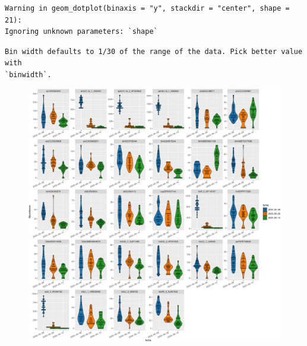 \documentclass[
  letterpaper,
  DIV=11,
  numbers=noendperiod]{scrartcl}
\begin{document}
\begin{verbatim}
Warning in geom_dotplot(binaxis = "y", stackdir = "center", shape = 21):
Ignoring unknown parameters: `shape`
\end{verbatim}

\begin{verbatim}
Bin width defaults to 1/30 of the range of the data. Pick better value with
`binwidth`.
\end{verbatim}

\begin{figure}[H]

{\centering \includegraphics{InformeNeiker_files/figure-pdf/unnamed-chunk-12-1.pdf}

}

\end{figure}
\end{document}
